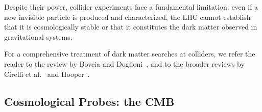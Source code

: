 Despite their power, collider experiments face a fundamental limitation: even if a new invisible particle is produced and characterized, the LHC cannot establish that it is cosmologically stable or that it constitutes the dark matter observed in gravitational systems.

For a comprehensive treatment of dark matter searches at colliders, we refer the reader to the review by Boveia and Doglioni~\cite{Boveia:2018yeb}, and to the broader reviews by Cirelli et al.~\cite{Cirelli:2024ssz} and Hooper~\cite{Hooper:2024}.

\subsection{\texorpdfstring{Cosmological Probes: the CMB}{Cosmological Probes: the CMB}}
\label{sec:1.3.3}


